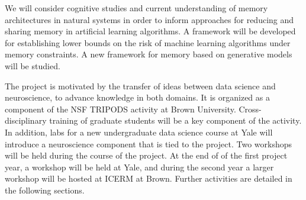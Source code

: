 We will consider cognitive studies and
current understanding of memory architectures in natural systems
in order to inform approaches for reducing and sharing memory in
artificial learning algorithms. A framework will be developed for
establishing lower bounds on the risk of machine learning algorithms under
memory constraints. A new framework for memory based on generative models
will be studied.
\vskip5pt

The project is motivated by the transfer of ideas between data science and neuroscience,
to advance knowledge in both domains. It is organized as a component
of the NSF TRIPODS activity at Brown University. Cross-disciplinary
training of graduate students will be a key component of the
activity. In addition, labs for a new undergraduate data science
course at Yale will introduce a neuroscience component that is tied to
the project. Two workshops will be held during the course of the
project. At the end of of the first project year, a workshop will be held at Yale, and 
during the second year a larger workshop will be hosted at ICERM at Brown. Further
activities are detailed in the following sections.
